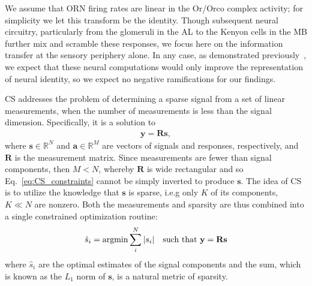 We assume that ORN firing rates are linear in the Or/Orco complex activity; for simplicity we let this transform be the identity. Though subsequent neural circuitry, particularly from the glomeruli in the AL to the Kenyon cells in the MB further mix and scramble these responses, we focus here on the information transfer at the sensory periphery alone. In any case, as demonstrated previously~\cite{vijay_1}, we expect that these neural computations would only improve the representation of neural identity, so we expect no negative ramifications for our findings.

CS addresses the problem of determining a sparse signal from a set of linear measurements, when the number of measurements is less than the signal dimension. Specifically, it is a solution to 
\begin{align}
\mathbf y = \mathbf R\mathbf s,
\label{eq:CS_constraints}
\end{align} where $\mathbf s \in \mathbb{R}^N$ and $\mathbf a\in \mathbb{R}^M$ are vectors of signals and responses, respectively, and $\mathbf R$ is the measurement matrix. Since measurements are fewer than signal components, then $M < N$, whereby $\mathbf R$ is wide rectangular and so Eq.~\ref{eq:CS_constraints} cannot be simply inverted to produce $\mathbf s$. The idea of CS is to utilize the knowledge that $\mathbf s$ is sparse, i.e.g only $K$ of its components, $K \ll N$ are nonzero. Both the measurements and sparsity are thus combined into a single constrained optimization routine:
\begin{align}
\hat s_i = \textup{argmin} \sum_i^N |s_i| \quad \textup{such that } \mathbf y = \mathbf R\mathbf s
\label{eq:CS}
\end{align}
where $\hat s_i$ are the optimal estimates of the signal components and the sum, which is known as the $L_1$ norm of $\mathbf s$, is a natural metric of sparsity. 

